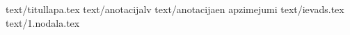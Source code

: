 \documentclass[12pt,a4paper]{report}
\begin{document}
	 {text/titullapa.tex}
	\setcounter{page}{2}
	 {text/anotacijalv}
	 {text/anotacijaen}
	\tableofcontents
	 {apzimejumi}
	 {text/ievads.tex}
	 {text/1.nodala.tex}
\end{document}
